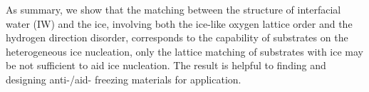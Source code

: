 \documentclass[aps,prl,twocolumn,superscriptaddress]{revtex4-1}
\begin{document}

  
  
As summary, we show that the matching between the structure of interfacial water (IW) and the ice, involving both the ice-like oxygen lattice order and the hydrogen direction disorder, corresponds to the capability of substrates on the heterogeneous ice nucleation, only the lattice matching of substrates with ice may be not sufficient to aid ice nucleation. The result is helpful to finding and designing anti-/aid- freezing materials for application. 
    
\end{document}
